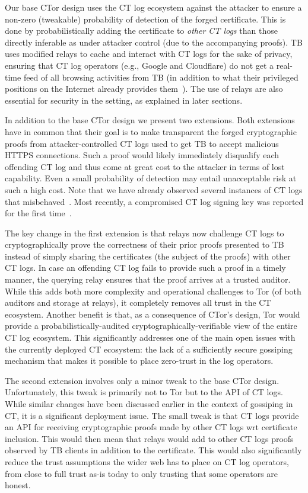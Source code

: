 Our base CTor design uses the CT log ecosystem against the attacker to ensure a
non-zero (tweakable) probability of detection of the forged certificate. This is
done by probabilistically adding the certificate to \emph{other CT logs} than
those directly inferable as under attacker control (due to the accompanying
proofs). TB uses modified relays to cache and interact with CT logs for the sake
of privacy, ensuring that CT log operators (e.g., Google and Cloudflare) do not
get a real-time feed of all browsing activities from TB (in addition to what
their privileged positions on the Internet already provides
them~\cite{1mtrack,TorDNS}). The use of relays are also essential for security
in the setting, as explained in later sections.

In addition to the base CTor design we present two extensions. Both extensions
have in common that their goal is to make transparent the forged cryptographic
proofs from attacker-controlled CT logs used to get TB to accept malicious HTTPS
connections. Such a proof would likely immediately disqualify each offending CT
log and thus come at great cost to the attacker in terms of lost capability.
Even a small probability of detection may entail unacceptable risk at such a
high cost. Note that we have already observed several instances of CT logs that
misbehaved~\cite{izenpe-disqualified,venafi-disqualified,gdca1-omission}. Most
recently, a compromised CT log signing key was reported for the first
time~\cite{digicert-log-compromised}. 

The key change in the first extension is that relays now challenge CT logs to
cryptographically prove the correctness of their prior proofs presented to TB
instead of simply sharing the certificates (the subject of the proofs) with
other CT logs. In case an offending CT log fails to provide such a proof
in a timely manner,
the querying relay ensures that the proof arrives at a trusted auditor. While
this adds both more complexity and operational challenges to Tor (of both
auditors and storage at relays), it completely removes all trust in the CT
ecosystem. Another benefit is that, as a consequence of CTor's design, Tor would
provide a probabilistically-audited cryptographically-verifiable view of the
entire CT log ecosystem. This significantly addresses one of the main open
issues with the currently deployed CT ecosystem: the lack of a sufficiently
secure gossiping mechanism that makes it possible to place zero-trust in the log
operators.

The second extension involves only a minor tweak to the base CTor design.
Unfortunately, this tweak is primarily not to Tor but to the API of CT logs.
While similar changes have been discussed earlier in the context of gossiping in
CT, it is a significant deployment issue. The small tweak is that CT logs
provide an API for receiving cryptographic proofs made by other CT logs wrt
certificate inclusion. This would then mean that relays would add to
other CT logs proofs observed by TB clients in addition to the certificate.
This would also significantly reduce the trust assumptions the wider web has to
place on CT log operators, from close to full trust as-is today to only trusting
that some operators are honest.

